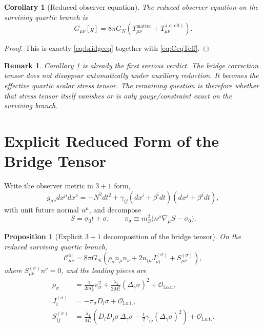 \documentclass[11pt]{article}
\newtheorem{proposition}{Proposition}
\newtheorem{remark}{Remark}
\newtheorem{corollary}{Corollary}
\begin{document}
\begin{corollary}[Reduced observer equation]
\label{cor:redeq}
The reduced observer equation on the surviving quartic branch is
\begin{equation}
G_{\mu\nu}[g]
=
8\pi G_N\left(
T_{\mu\nu}^{\mathrm{matter}}
+ T_{\mu\nu}^{(\sigma,\mathrm{eff})}
\right).
\label{eq:redeq}
\end{equation}
\end{corollary}

\begin{proof}
This is exactly \eqref{eq:bridgeeq} together with \eqref{eq:CeqTeff}.
\end{proof}

\begin{remark}
Corollary \ref{cor:redeq} is already the first serious verdict. The bridge correction tensor does not disappear automatically under auxiliary reduction. It becomes the effective quartic scalar stress tensor. The remaining question is therefore whether that stress tensor itself vanishes or is only gauge/constraint exact on the surviving branch.
\end{remark}

\section{Explicit Reduced Form of the Bridge Tensor}

Write the observer metric in \(3+1\) form,
\begin{equation}
g_{\mu\nu}dx^\mu dx^\nu
=
-N^2dt^2+\gamma_{ij}(dx^i+\beta^i dt)(dx^j+\beta^j dt),
\label{eq:ADM}
\end{equation}
with unit future normal \(n^\mu\), and decompose
\begin{equation}
S=\sigma_0 t+\sigma,
\qquad
\pi_\sigma
\equiv
m_S^2\bigl(n^\mu\nabla_\mu S-\sigma_0\bigr).
\label{eq:pisigma}
\end{equation}

\begin{proposition}[Explicit \(3+1\) decomposition of the bridge tensor]
\label{prop:3plus1}
On the reduced surviving quartic branch,
\begin{equation}
\mathcal C_{\mu\nu}^{\mathrm{br}}
=
8\pi G_N
\left(
\rho_\sigma n_\mu n_\nu
+2n_{(\mu}J_{\nu)}^{(\sigma)}
+S_{\mu\nu}^{(\sigma)}
\right),
\label{eq:C3plus1}
\end{equation}
where \(S_{\mu\nu}^{(\sigma)}n^\nu=0\), and the leading pieces are
\begin{align}
\rho_\sigma
&=
\frac{1}{2m_S^2}\pi_\sigma^2
+\frac{\lambda_4}{2M_*^2}(\Delta_\gamma\sigma)^2
+\mathcal O_{\mathrm{l.o.t.}},
\label{eq:rhosigma}
\\
J_i^{(\sigma)}
&=
-\pi_\sigma D_i\sigma
+\mathcal O_{\mathrm{l.o.t.}},
\label{eq:Jsigma}
\\
S_{ij}^{(\sigma)}
&=
\frac{\lambda_4}{M_*^2}
\left(
D_iD_j\sigma\,\Delta_\gamma\sigma
-\frac{1}{2}\gamma_{ij}(\Delta_\gamma\sigma)^2
\right)
+\mathcal O_{\mathrm{l.o.t.}}.
\label{eq:Sijsigma}
\end{align}
\end{proposition}
\end{document}
